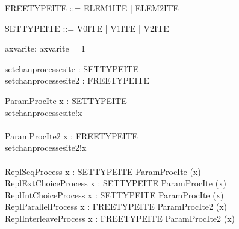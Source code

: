 \begin{zed}
   FREETYPEITE ::= ELEM1ITE | ELEM2ITE
\end{zed}

\begin{zed}
   SETTYPEITE ::= V0ITE | V1ITE | V2ITE
\end{zed}

\begin{axdef}
  axvarite: \nat
\where
  axvarite = 1
\end{axdef}

\begin{circus}
 \circchannel setchanprocessesite : SETTYPEITE \\
 \circchannel setchanprocessesite2 : FREETYPEITE \\
\end{circus}
\begin{circus}
\circprocess ParamProcIte \circdef x : SETTYPEITE \circspot \circbegin \\
   \circspot setchanprocessesite!x \then \Skip \\
\circend \\

\circprocess ParamProcIte2 \circdef x : FREETYPEITE \circspot \circbegin \\ %
   \circspot setchanprocessesite2!x \then \Skip \\
\circend \\

\circprocess ReplSeqProcess \circdef \Semi x : SETTYPEITE \circspot ParamProcIte (x) \\
\circprocess ReplExtChoiceProcess \circdef \Extchoice x : SETTYPEITE \circspot ParamProcIte (x) \\
\circprocess ReplIntChoiceProcess \circdef \Intchoice x : SETTYPEITE \circspot ParamProcIte (x) \\
\circprocess ReplParallelProcess \circdef \Parallel x : FREETYPEITE \lpar \lchanset \rchanset \rpar \circspot ParamProcIte2 (x) \\
\circprocess ReplInterleaveProcess \circdef \Interleave x : FREETYPEITE \circspot ParamProcIte2 (x) \\
\end{circus}
